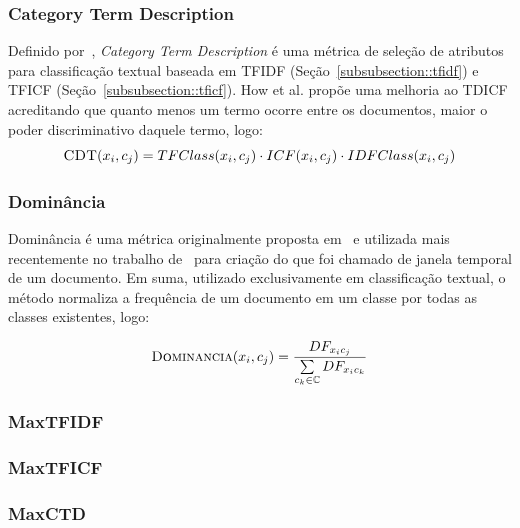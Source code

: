 \subsubsection{Category Term Description}
\label{subsubsection::ctd}

Definido por~\cite{ChihHow04}, \textit{Category Term Description} é uma métrica de seleção de atributos para classificação textual baseada em TFIDF (Seção~\ref{subsubsection::tfidf}) e TFICF (Seção~\ref{subsubsection::tficf}). How et al. propõe uma melhoria ao TDICF acreditando que quanto menos um termo ocorre entre os documentos, maior o poder discriminativo daquele termo, logo:
\begin{equation}\label{eqn::cdt}
 \textsc{CDT}(x_i, c_j) = TFClass(x_i, c_j) \cdot ICF(x_i, c_j) \cdot IDFClass(x_i,c_j)
\end{equation}

\subsubsection{Dominância}
\label{subsubsection::dom}

Dominância é uma métrica originalmente proposta em~\cite{Zaiane02} e utilizada mais recentemente no trabalho de~\cite{Rocha08} para criação do que foi chamado de janela temporal de um documento. Em suma, utilizado exclusivamente em classificação textual, o método normaliza a frequência de um documento em um classe por todas as classes existentes, logo:

\begin{equation}\label{eqn::dom}
 \textsc{Dominancia}(x_i, c_j) = \frac{ DF_{x_ic_j} } { \sum\limits_{c_k \in \mathbb{C}} DF_{ x_ic_k } } 
\end{equation}

\subsubsection{MaxTFIDF}
\label{subsubsection::maxtfidf}

\subsubsection{MaxTFICF} 
\label{subsubsection::maxtficf}

\subsubsection{MaxCTD}
\label{subsubsection::maxctd}

